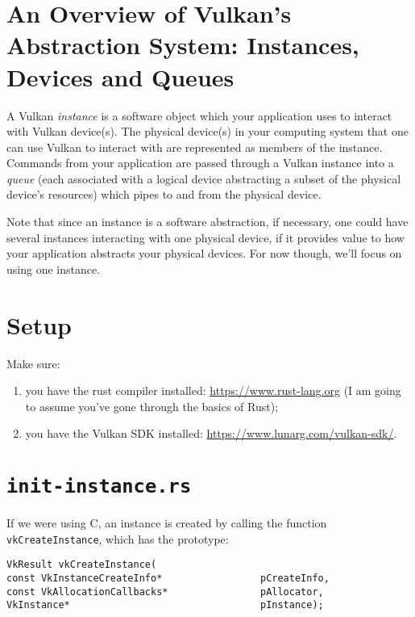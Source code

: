 \documentclass[12pt,letterpaper]{article}
\newcommand{\cil}[1]{\texttt{#1}}
\begin{document}
\section{An Overview of Vulkan's Abstraction System: Instances, Devices and Queues}

	A Vulkan \emph{instance} is a software object which your application uses to interact with Vulkan device(s). The physical device(s) in your computing system that one can use Vulkan to interact with are represented as members of the instance. Commands from your application are passed through a Vulkan instance into a \emph{queue} (each associated with a logical device abstracting a subset of the physical device's resources) which pipes to and from the physical device. 
	
	Note that since an instance is a software abstraction, if necessary, one could have several instances interacting with one physical device, if it provides value to how your application abstracts your physical devices. For now though, we'll focus on using one instance.

\section{Setup}
	Make sure:
		\begin{enumerate}
			\item you have the rust compiler installed: \href{https://www.rust-lang.org}{https://www.rust-lang.org} (I am going to assume you've gone through the basics of Rust);
			
			\item you have the Vulkan SDK installed: \href{https://www.lunarg.com/vulkan-sdk/}{https://www.lunarg.com/vulkan-sdk/}.
		\end{enumerate}
	
\section{\texttt{init-instance.rs}}
	
	If we were using C, an instance is created by calling the function \cil{vkCreateInstance}, which has the prototype:
		\begin{verbatim}
VkResult vkCreateInstance(
const VkInstanceCreateInfo*                 pCreateInfo,
const VkAllocationCallbacks*                pAllocator,
VkInstance*                                 pInstance);
		\end{verbatim}
		
\end{document}
